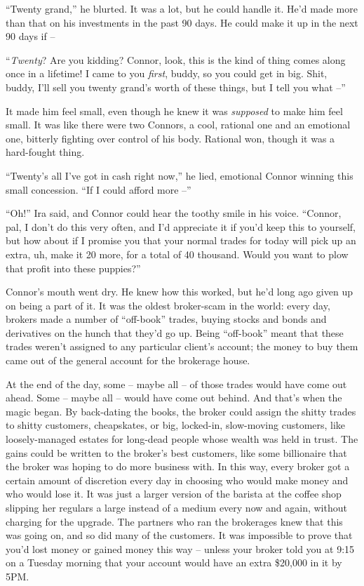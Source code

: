 ``Twenty grand,'' he blurted. It was a lot, but he could handle it.
He'd made more than that on his investments in the past 90 days. He
could make it up in the next 90 days if --

``\emph{Twenty}? Are you kidding? Connor, look, this is the kind of
thing comes along once in a lifetime! I came to you \emph{first},
buddy, so you could get in big. Shit, buddy, I'll sell you twenty
grand's worth of these things, but I tell you what --''

It made him feel small, even though he knew it was \emph{supposed}
to make him feel small. It was like there were two Connors, a cool,
rational one and an emotional one, bitterly fighting over control
of his body. Rational won, though it was a hard-fought thing.

``Twenty's all I've got in cash right now,'' he lied, emotional
Connor winning this small concession. ``If I could afford more --''

``Oh!'' Ira said, and Connor could hear the toothy smile in his
voice. ``Connor, pal, I don't do this very often, and I'd appreciate
it if you'd keep this to yourself, but how about if I promise you
that your normal trades for today will pick up an extra, uh, make
it 20 more, for a total of 40 thousand. Would you want to plow that
profit into these puppies?''

Connor's mouth went dry. He knew how this worked, but he'd long ago
given up on being a part of it. It was the oldest broker-scam in
the world: every day, brokers made a number of ``off-book'' trades,
buying stocks and bonds and derivatives on the hunch that they'd go
up. Being ``off-book'' meant that these trades weren't assigned to
any particular client's account; the money to buy them came out of
the general account for the brokerage house.

At the end of the day, some -- maybe all -- of those trades would
have come out ahead. Some -- maybe all -- would have come out
behind. And that's when the magic began. By back-dating the books,
the broker could assign the shitty trades to shitty customers,
cheapskates, or big, locked-in, slow-moving customers, like
loosely-managed estates for long-dead people whose wealth was held
in trust. The gains could be written to the broker's best
customers, like some billionaire that the broker was hoping to do
more business with. In this way, every broker got a certain amount
of discretion every day in choosing who would make money and who
would lose it. It was just a larger version of the barista at the
coffee shop slipping her regulars a large instead of a medium every
now and again, without charging for the upgrade. The partners who
ran the brokerages knew that this was going on, and so did many of
the customers. It was impossible to prove that you'd lost money or
gained money this way -- unless your broker told you at 9:15 on a
Tuesday morning that your account would have an extra \$20,000 in
it by 5PM.

